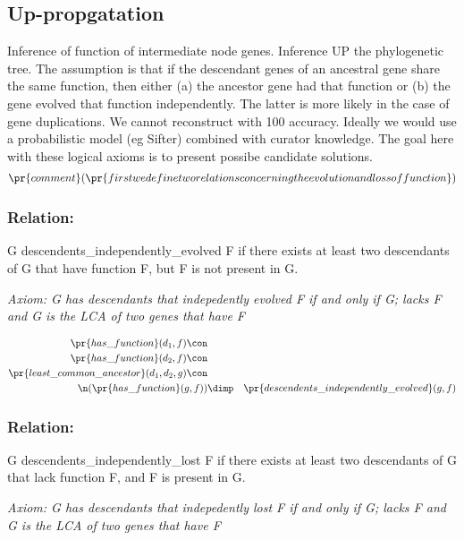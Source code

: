 \subsection{Up-propgatation}
Inference of function of intermediate
node genes. Inference UP the phylogenetic tree. The assumption is that
if the descendant genes of an ancestral gene share the same function,
then either (a) the ancestor gene had that function or (b) the gene
evolved that function independently. The latter is more likely in the
case of gene duplications. We cannot reconstruct with 100%
accuracy. Ideally we would use a probabilistic model (eg Sifter)
combined with curator knowledge. The goal here with these logical
axioms is to present possibe candidate solutions.
\begin{eqnarray*}
 \pr{comment}( \pr{first we define two relations concerning the evolution and
loss of function}) 
\end{eqnarray*}
\subsubsection{Relation:  }


G
descendents\_independently\_evolved F if there exists at least two
descendants of G that have function F, but F is not present in G.

\emph{Axiom: G has descendants that indepedently evolved F if and only if G; lacks F and G is the LCA of two genes that have F}

\begin{eqnarray*}
 \pr{has\_function}(d_1, f) \con \\
 \pr{has\_function}(d_2, f) \con \\
 \pr{least\_common\_ancestor}(d_1, d_2, g) \con \\
 \n( \pr{has\_function}(g, f) )&\dimp & \pr{descendents\_independently\_evolved}(g, f) 
\end{eqnarray*}
\subsubsection{Relation:  }


G
descendents\_independently\_lost F if there exists at least two
descendants of G that lack function F, and F is present in G.

\emph{Axiom: G has descendants that indepedently lost F if and only if G; lacks F and G is the LCA of two genes that have F}

